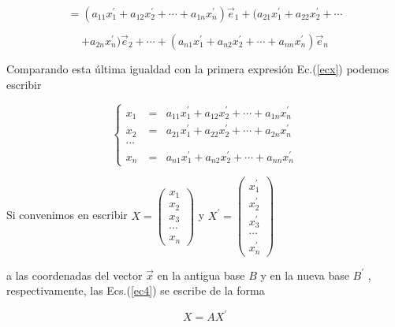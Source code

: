 \bigskip

$$=(a_{11}x_1^{\prime}+  a_{12}x_2^{\prime}  +\cdots + a_{1n}x_n^{\prime}  )\vec{e}_1+ (a_{21}x_1^{\prime}+  a_{22}x^{\prime}_2  +\cdots$$


$$+ a_{2n}x_n^{\prime}  )   \vec{e}_2+\cdots +   (a_{n1}x_1^{\prime} +  a_{n2}x_2^{\prime}   +\cdots + a_{nn}x_n^{\prime}   )\vec{e}_n$$

\bigskip


Comparando esta última igualdad con la primera expresión Ec.(\ref{ecx}) podemos escribir 

\begin{equation} \label{ec4}
\left\{ \begin{array} {ccl} 
                    x_1&\ =&   a_{11}x_1^{\prime}+a_{12}x_2^{\prime}+\cdots +a_{1n}x_n^{\prime}    \\
                     x_2 &\ = &a_{21}x_1^{\prime}+a_{22}x_2^{\prime}+\cdots +a_{2n}x_n^{\prime}  \\
										\cdots  \\
                    x_n &\ =&a_{n1}x_1^{\prime}+a_{n2}x_2^{\prime}+\cdots +a_{nn}x_n^{\prime}
                   \end{array}
           \right.
\end{equation}


Si convenimos en escribir $X=\left(\begin{array}{c} x_{1} \\ x_{2}  
\\  x_3 \\ \cdots \\ x_{n} 
\end{array}
 \right)$ y $X^{\prime}=\left(\begin{array}{c} x^{\prime}_{1} \\ x^{\prime}_{2}  
\\  x^{\prime}_3 \\ \cdots \\ x^{\prime}_{n} 
\end{array}\right)$ 

\bigskip
\noindent
a las coordenadas del vector $\vec{x}$ en la antigua base  $B$  y en la nueva base $B ^{\prime}$ , respectivamente, las Ecs.(\ref{ec4}) se escribe  de la forma

\begin{equation}
\label{XPAX}
X=AX^{\prime}
\end{equation}

